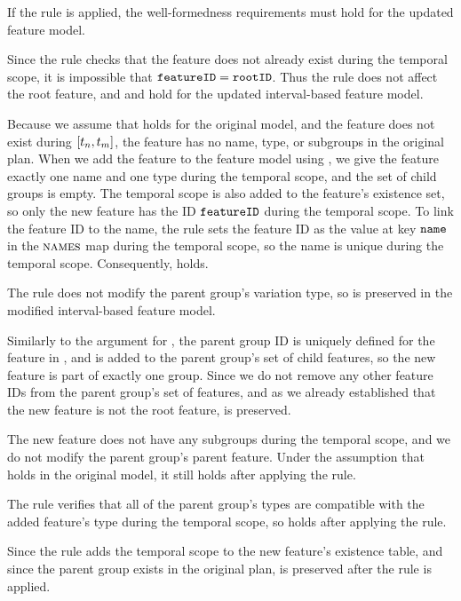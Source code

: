 If the rule is applied, the well-formedness requirements must hold for the updated feature model. 

Since the rule checks that the feature does not already exist during the temporal scope, it is impossible that $\texttt{featureID} = \texttt{rootID}$. Thus the rule does not affect the root feature, and  and  hold for the updated interval-based feature model.

Because we assume that  holds for the original model, and the feature does not exist during $\interval{t_n}{t_m}$, the feature has no name, type, or subgroups in the original plan. When we add the feature to the feature model using , we give the feature exactly one name and one type during the temporal scope, and the set of child groups is empty. The temporal scope is also added to the feature's existence set, so only the new feature has the ID $\texttt{featureID}$ during the temporal scope. To link the feature ID to the name, the rule sets the feature ID as the value at key $\texttt{name}$ in the $\textsc{names}{}$ map during the temporal scope, so the name is unique during the temporal scope.
Consequently,  holds.

The rule does not modify the parent group's variation type, so  is preserved in the modified interval-based feature model.

Similarly to the argument for , the parent group ID is uniquely defined for the feature in , and  is added to the parent group's set of child features, so the new feature is part of exactly one group. Since we do not remove any other feature IDs from the parent group's set of features, and as we already established that the new feature is not the root feature,  is preserved.

The new feature does not have any subgroups during the temporal scope, and we do not modify the parent group's parent feature. Under the assumption that  holds in the original model, it still holds after applying the  rule.

The rule verifies that all of the parent group's types are compatible with the added feature's type during the temporal scope, so  holds after applying the rule.

Since the rule adds the temporal scope to the new feature's existence table, and since the parent group exists in the original plan,  is preserved after the rule is applied.

